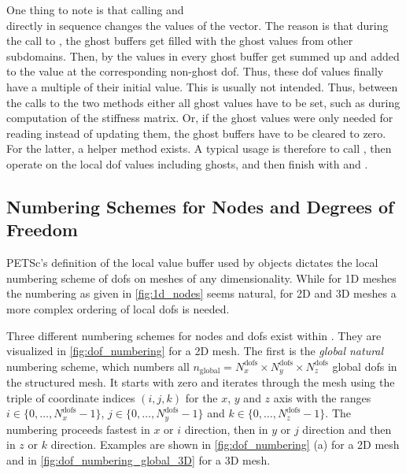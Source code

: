 One thing to note is that calling  and \\ directly in sequence changes the values of the vector. The reason is that during the call to , the ghost buffers get filled with the ghost values from other subdomains. Then, by  the values in every ghost buffer get summed up and added to the value at the corresponding non-ghost dof. Thus, these dof values finally have a multiple of their initial value.  This is usually not intended. Thus, between the calls to the two methods either all ghost values have to be set, such as during computation of the stiffness matrix. Or, if the ghost values were only needed for reading instead of updating them, the ghost buffers have to be cleared to zero. For the latter, a helper method  exists. A typical usage is therefore to call , then operate on the local dof values including ghosts, and then finish with  and .


\subsection{Numbering Schemes for Nodes and Degrees of Freedom}\label{sec:numbering_schemes_for}

PETSc's definition of the local value buffer used by \Vec{} objects dictates the local numbering scheme of dofs on meshes of any dimensionality. While for 1D meshes the numbering as given in \cref{fig:1d_nodes} seems natural, for 2D and 3D meshes a more complex ordering of local dofs is needed.

Three different numbering schemes for nodes and dofs exist within \opendihu{}. They are visualized in \cref{fig:dof_numbering} for a 2D mesh. The first is the \emph{global natural} numbering scheme, which numbers all $n_\text{global} = N^\text{dofs}_x \times N^\text{dofs}_y \times N^\text{dofs}_z$ global dofs in the structured mesh. It starts with zero and iterates through the mesh using the triple of coordinate indices $(i,j,k)$ for the $x$, $y$ and $z$ axis with the ranges $i \in \{0,\dots,N^\text{dofs}_x-1\}$, $j \in \{0,\dots,N^\text{dofs}_y-1\}$ and $k \in \{0,\dots,N^\text{dofs}_z-1\}$. The numbering proceeds fastest in $x$ or $i$ direction, then in $y$ or $j$ direction and then in $z$ or $k$ direction. Examples are shown in \cref{fig:dof_numbering} (a) for a 2D mesh  and in \cref{fig:dof_numbering_global_3D} for a 3D mesh.

